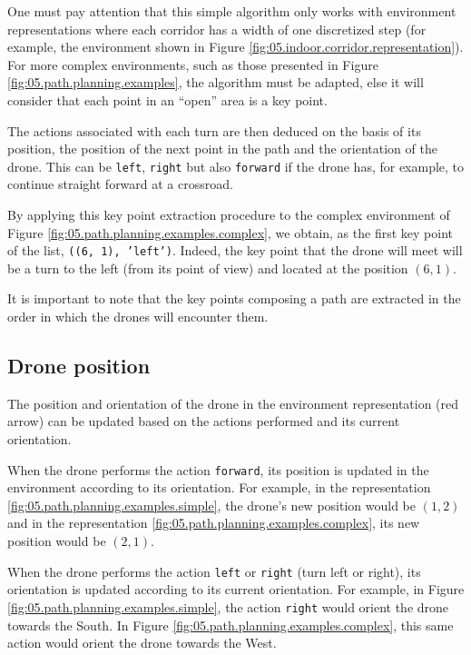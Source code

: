 \begin{note}
    One must pay attention that this simple algorithm only works with environment representations where each corridor has a width of one discretized step (for example, the environment shown in Figure \ref{fig:05.indoor.corridor.representation}). For more complex environments, such as those presented in Figure \ref{fig:05.path.planning.examples}, the algorithm must be adapted, else it will consider that each point in an \enquote{open} area is a key point.
\end{note}

The actions associated with each turn are then deduced on the basis of its position, the position of the next point in the path and the orientation of the drone. This can be \texttt{left}, \texttt{right} but also \texttt{forward} if the drone has, for example, to continue straight forward at a crossroad.

By applying this key point extraction procedure to the complex environment of Figure \ref{fig:05.path.planning.examples.complex}, we obtain, as the first key point of the list, \texttt{((6, 1), 'left')}. Indeed, the key point that the drone will meet will be a turn to the left (from its point of view) and located at the position $(6, 1)$.

It is important to note that the key points composing a path are extracted in the order in which the drones will encounter them.

\subsection{Drone position}\label{sec:05.drone.position}

The position and orientation of the drone in the environment representation (red arrow) can be updated based on the actions performed and its current orientation.

When the drone performs the action \texttt{forward}, its position is updated in the environment according to its orientation. For example, in the representation \ref{fig:05.path.planning.examples.simple}, the drone's new position would be $(1, 2)$ and in the representation \ref{fig:05.path.planning.examples.complex}, its new position would be $(2, 1)$.

When the drone performs the action \texttt{left} or \texttt{right} (turn left or right), its orientation is updated according to its current orientation. For example, in Figure \ref{fig:05.path.planning.examples.simple}, the action \texttt{right} would orient the drone towards the South. In Figure \ref{fig:05.path.planning.examples.complex}, this same action would orient the drone towards the West.

